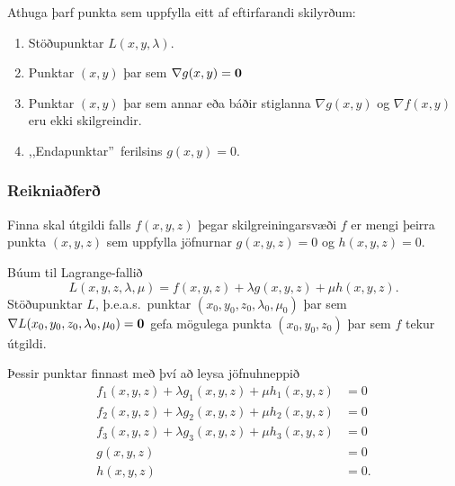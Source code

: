 Athuga þarf punkta sem uppfylla eitt af eftirfarandi skilyrðum:

\begin {enumerate}
\item Stöðupunktar $L(x,y,\lambda)$.
\item Punktar $(x,y)$ þar sem $\nabla g(x,y)=\mbox{${\bf 0}$}$
\item Punktar $(x,y)$ þar sem annar eða báðir stiglanna $\nabla g(x,y)$ og $\nabla f(x,y)$ eru ekki skilgreindir. 
\item ,,Endapunktar''\ ferilsins $g(x,y)=0$.
 \end {enumerate}





\subsubsection{Reikniaðferð  }
Finna skal útgildi falls $f(x,y,z)$ þegar skilgreiningarsvæði $f$ er mengi þeirra punkta $(x,y,z)$ sem uppfylla jöfnurnar $g(x,y,z)=0$ og $h(x,y,z)=0$.  

Búum til Lagrange-fallið
$$L(x,y,z,\lambda,\mu)=f(x,y,z)+\lambda g(x,y,z)+\mu h(x,y,z).$$
Stöðupunktar $L$, þ.e.a.s.~punktar $(x_0,y_0,z_0,\lambda_0,\mu_0)$ þar sem $\nabla L(x_0,y_0,z_0,\lambda_0,\mu_0)=\mbox{${\bf 0}$}$ gefa mögulega punkta $(x_0,y_0,z_0)$ þar sem $f$ tekur útgildi.

Þessir punktar finnast með því að leysa jöfnuhneppið
\begin{align*}
f_1(x,y,z)+\lambda g_1(x,y,z)+\mu h_1(x,y,z)&=0\\
f_2(x,y,z)+\lambda g_2(x,y,z)+\mu h_2(x,y,z)&=0\\
f_3(x,y,z)+\lambda g_3(x,y,z)+\mu h_3(x,y,z)&=0\\
g(x,y,z)&=0\\
h(x,y,z)&=0.
\end{align*}








